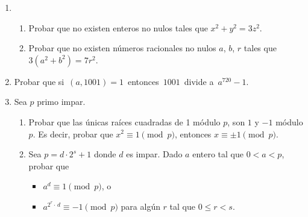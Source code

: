 \documentclass[a4paper,12pt,twoside,spanish,reqno]{amsbook}
\numberwithin{equation}{section}
\begin{document}
\begin{enumerate}
\item \begin{enumerate}
\item Probar que no existen enteros no nulos tales que $x^2 + y^2 = 3z^2$.
\item Probar que no existen n\'umeros racionales no nulos $a$, $b$, $r$ tales que $3(a^2 + b^2) = 7r^2$.
\end{enumerate}



%

%
\item Probar que si \,$(a,1001)=1$\, entonces \,$1001$\, divide a \,$a^{720}-1$.

\item Sea $p$ primo impar. 
\begin{enumerate}
    \item Probar que las únicas raíces cuadradas de 1 módulo $p$,  son $1$ y $-1$ módulo $p$. Es decir, probar que $x^2 \equiv 1 \pmod{p}$, entonces  $x \equiv \pm1 \pmod{p}$.
    \item Sea  $p = d \cdot 2^s + 1$ donde $d$ es impar. Dado $a$ entero tal que $0 < a <p$, probar que 
    \begin{itemize}
        \item $a^{d} \equiv 1 \pmod{p}$, o
        \item $a^{2^r\cdot\, d} \equiv -1 \pmod{p}$  para algún $r$ tal que $0 \le r < s$.
    \end{itemize}
\end{enumerate}
\end{enumerate}
\end{document}
